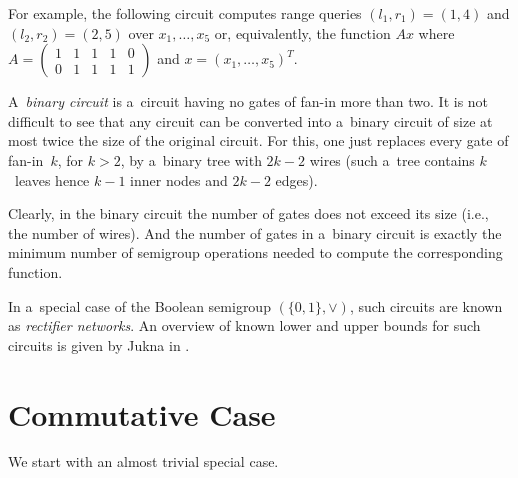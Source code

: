 \documentclass[11pt,letterpaper]{article}
\begin{document}
For example, the following circuit computes range queries $(l_1,r_1)=(1,4)$ and $(l_2,r_2)=(2,5)$ over $x_1, \dotsc, x_5$ or, equivalently, the function $Ax$ where $A=\begin{pmatrix}1&1&1&1&0\\0&1&1&1&1\end{pmatrix}$ and $x=(x_1, \dotsc, x_5)^T$.

\begin{center}
\end{center}

A~{\em binary circuit} is a~circuit having no gates of fan-in more than two. It is not difficult to see that any circuit can be converted into a~binary circuit of size at most twice the size of the original circuit. For this, one just replaces every gate of fan-in~$k$, for $k>2$, by a~binary tree with $2k-2$ wires (such a~tree contains $k$~leaves hence $k-1$ inner nodes and $2k-2$ edges).

Clearly, in the binary circuit the number of gates does not exceed its size (i.e., the number of wires). And the number of gates in a~binary circuit is exactly the minimum number of semigroup operations needed to compute the corresponding function.

In a~special case of the Boolean semigroup $(\{0,1\}, \lor)$, such circuits are known as {\em rectifier networks}. An overview of known lower and upper bounds for such circuits is given by Jukna in \cite[Section~13.6]{DBLP:books/daglib/0028687}.




\section{Commutative Case}

We start with an almost trivial special case.
\end{document}
